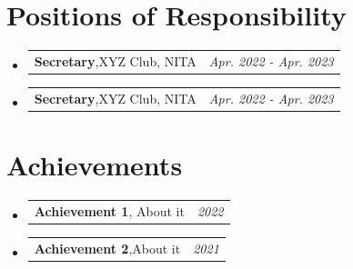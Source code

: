 \documentclass[a4paper,11pt]{article}
\makeatletter
\newcommand{\resumePOR}[3]{
\vspace{0.5mm}\item
    \begin{tabular*}{0.97\textwidth}[t]{l@{\extracolsep{\fill}}r}
        \textbf{#1},\hspace{0.3mm}#2 & \textit{\small{#3}} 
    \end{tabular*}
    \vspace{-2mm}
}
\newcommand{\resumeSubHeadingListStart}{\begin{itemize}[leftmargin=*,labelsep=0mm]}
\newcommand{\resumeSubHeadingListEnd}{\end{itemize}\vspace{2mm}}
\makeatother
\begin{document}
\section{\textbf{Positions of Responsibility}}
\vspace{-0.4mm}
\resumeSubHeadingListStart
  \resumePOR{Secretary} %
    {XYZ Club, NITA} %
    {Apr. 2022 - Apr. 2023} %
  \resumePOR{Secretary} %
    {XYZ Club, NITA} %
    {Apr. 2022 - Apr. 2023} %
\resumeSubHeadingListEnd
\vspace{-4mm}


\section{\textbf{Achievements}}
\vspace{-0.1mm}
\resumeSubHeadingListStart
\resumePOR{Achievement 1} %
    { About it} %
    {2022} %
\vspace{-0.1mm}
\resumePOR{Achievement 2} %
    {About it} %
    {2021} %
\vspace{-0.1mm}
\resumeSubHeadingListEnd
\vfill
{}
\end{document}
